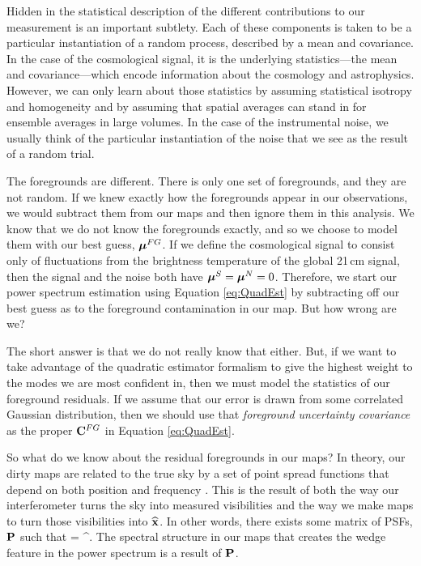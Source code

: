 Hidden in the statistical description of the different contributions to our measurement is an important subtlety. Each of these components is taken to be a particular instantiation of a random process, described by a mean and covariance. In the case of the cosmological signal, it is the underlying statistics---the mean and covariance---which encode information about the cosmology and astrophysics. However, we can only learn about those statistics by assuming statistical isotropy and homogeneity and by assuming that spatial averages can stand in for ensemble averages in large volumes. In the case of the instrumental noise, we usually think of the particular instantiation of the noise that we see as the result of a random trial. 

The foregrounds are different. There is only one set of foregrounds, and they are not random. If we knew exactly how the foregrounds appear in our observations, we would subtract them from our maps and then ignore them in this analysis. We know that we do not know the foregrounds exactly, and so we choose to model them with our best guess, $\boldsymbol\mu^{FG}$. If we define the cosmological signal to consist only of fluctuations from the brightness temperature of the global 21\,cm signal, then the signal and the noise both have $\boldsymbol\mu^S = \boldsymbol\mu^N = 0$. Therefore, we start our power spectrum estimation using Equation \eqref{eq:QuadEst} by subtracting off our best guess as to the foreground contamination in our map. But how wrong are we? 

The short answer is that we do not really know that either. But, if we want to take advantage of the quadratic estimator formalism to give the highest weight to the modes we are most confident in, then we must model the statistics of our foreground residuals. If we assume that our error is drawn from some correlated Gaussian distribution, then we should use that \emph{foreground uncertainty covariance} as the proper $\mathbf{C}^{FG}$ in Equation \eqref{eq:QuadEst}.

So what do we know about the residual foregrounds in our maps? In theory, our dirty maps are related to the true sky by a set of point spread functions that depend on both position and frequency \cite{mapmaking}. This is the result of both the way our interferometer turns the sky into measured visibilities and the way we make maps to turn those visibilities into $\widehat{\mathbf{x}}$. In other words, there exists some matrix of PSFs, $\mathbf{P}$ such that
\beq
\langle \xhat \rangle = \PSF \x^.
\eeq
The spectral structure in our maps that creates the wedge feature in the power spectrum is a result of $\mathbf{P}$.

